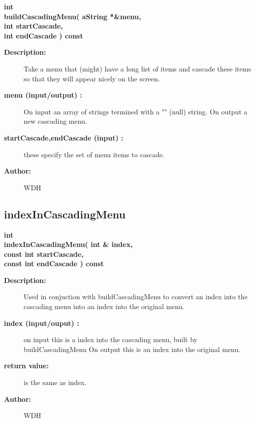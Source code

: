 \begin{flushleft} \textbf{%
int  \\ 
\settowidth{\GenericGraphicsInterfaceIncludeArgIndent}{buildCascadingMenu(}%
buildCascadingMenu( aString *\&menu,\\ 
\hspace{\GenericGraphicsInterfaceIncludeArgIndent}int startCascade, \\ 
\hspace{\GenericGraphicsInterfaceIncludeArgIndent}int endCascade ) const
}\end{flushleft}
\begin{description}
\item[{\bf Description:}] 
    Take a menu that (might) have a long list of items and cascade these items so that
 they will appear nicely on the screen.

\item[{\bf menu (input/output) :}]  On input an array of strings termined with a "" (null) string. On output
    a new cascading menu.
\item[{\bf startCascade,endCascade (input) :}]  these specify the set of menu items to
    cascade. 
\item[{\bf Author:}]  WDH
\end{description}
\subsection{indexInCascadingMenu}
 
\begin{flushleft} \textbf{%
int  \\ 
\settowidth{\GenericGraphicsInterfaceIncludeArgIndent}{indexInCascadingMenu(}%
indexInCascadingMenu( int \& index,\\ 
\hspace{\GenericGraphicsInterfaceIncludeArgIndent}const int startCascade,\\ 
\hspace{\GenericGraphicsInterfaceIncludeArgIndent}const int endCascade ) const
}\end{flushleft}
\begin{description}
\item[{\bf Description:}] 
    Used in conjuction with buildCascadingMenu to convert an index into the cascading menu into
   an index into the original menu.
\item[{\bf index (input/ouput) :}]  on input this is a index into the cascading menu, built by buildCascadingMenu
   On output this is an index into the original menu.
\item[{\bf return value:}]  is the same as index.

\item[{\bf Author:}]  WDH
\end{description}
